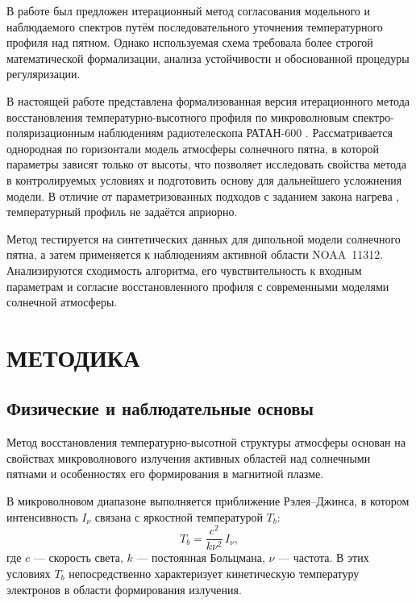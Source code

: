 \documentclass[
 aps, pra,
 amsmath,amssymb,
 11pt,
 final,
tightenlines,
 twoside,
 twocolumn,
 nofloats,
nofootinbib,
 superscriptaddress,
showkeys,
showkeywords,
 ]
{revtex4-2}
\newcommand{\as}[1]{{\color{blue} #1}}
\begin{document}
В работе \cite{Stupishin2018} был предложен итерационный метод согласования модельного и наблюдаемого спектров путём последовательного уточнения температурного профиля  \as{над пятном}. Однако используемая схема требовала более строгой математической формализации, анализа устойчивости и обоснованной процедуры регуляризации.

В настоящей работе представлена формализованная версия итерационного метода восстановления температурно-высотного профиля по микроволновым спектро-поляризационным наблюдениям радиотелескопа РАТАН-600 \citep{Parijskij1993,Bogod2011,Bogod2023}. Рассматривается однородная по горизонтали модель атмосферы  \as{солнечного пятна}, в которой параметры зависят только от высоты, что позволяет исследовать свойства метода в контролируемых условиях и подготовить основу для дальнейшего усложнения модели. В отличие от параметризованных подходов с заданием закона нагрева \citep{Fleishman2021_Heating_Law}, температурный профиль не задаётся априорно.

Метод тестируется на синтетических данных для дипольной модели солнечного пятна, а затем применяется к наблюдениям активной области NOAA~11312. Анализируются сходимость алгоритма, его чувствительность к входным параметрам и согласие восстановленного профиля с современными моделями солнечной атмосферы.
\section{МЕТОДИКА}
\label{sec:method}
\subsection{Физические и наблюдательные  основы}

Метод восстановления температурно-высотной структуры атмосферы
основан на свойствах микроволнового излучения активных областей  \as{над  солнечными пятнами}
и особенностях его формирования в магнитной плазме.

В микроволновом диапазоне выполняется приближение Рэлея–Джинса,
в котором интенсивность $I_\nu$ связана с яркостной температурой $T_b$:
\begin{equation}
T_b = \frac{c^2}{k\nu^2}\, I_\nu ,
\end{equation}
где $c$ --- скорость света, $k$ --- постоянная Больцмана,
$\nu$ --- частота. В этих условиях $T_b$ непосредственно
характеризует кинетическую температуру электронов
в области формирования излучения.
\end{document}
